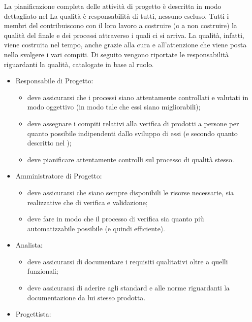 			La pianificazione completa delle attività di progetto è descritta in modo dettagliato nel 
		 \label{subsec:responsabilita}
			La qualità è responsabilità di tutti, nessuno escluso. Tutti i membri del  contribuiscono con il loro lavoro a costruire (o a non 
			costruire) la qualità del  finale e dei processi attraverso i quali ci si arriva. La qualità, infatti, viene costruita nel tempo, 
			anche grazie alla cura e all'attenzione che viene posta nello svolgere i vari compiti.
			Di seguito vengono riportate le responsabilità riguardanti la qualità, catalogate in base al ruolo.
			\begin{itemize}
				\item Responsabile di Progetto:
				\begin{itemize}
					\item deve assicurarsi che i processi siano attentamente controllati e valutati in modo oggettivo (in modo tale che essi siano 
					migliorabili);
					\item deve assegnare i compiti relativi alla verifica di prodotti a persone per quanto possibile indipendenti dallo sviluppo di essi 
					(e secondo quanto descritto nel );
					\item deve pianificare attentamente controlli sul processo di qualità stesso.
				\end{itemize}
				\item Amministratore di Progetto:
				\begin{itemize}
					\item deve assicurarsi che siano sempre disponibili le risorse necessarie, sia realizzative che di verifica e validazione;
					\item deve fare in modo che il processo di verifica sia quanto più automatizzabile possibile (e quindi efficiente).
				\end{itemize}
				\item Analista:
				\begin{itemize}
					\item deve assicurarsi di documentare i requisiti qualitativi oltre a quelli funzionali;
					\item deve assicurarsi di aderire agli standard e alle norme riguardanti la documentazione da lui stesso prodotta.
				\end{itemize}
				\item Progettista:
				\begin{itemize}

\end{itemize}
\end{itemize}
